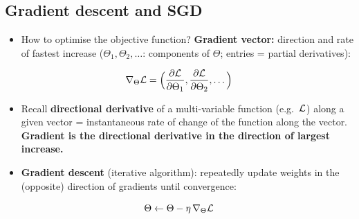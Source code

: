 \subsection{Gradient descent and SGD}\label{sec:lec03-sgd}

\begin{itemize}
  \item How to optimise the objective function? \textbf{Gradient vector:}
    direction and rate of fastest increase ($\Theta_1,\Theta_2,\dots$:
    components of $\Theta$; entries = partial derivatives):
\end{itemize}
\begin{equation}\label{eq:lec03-grad}
  \nabla_\Theta\mathcal{L} = \Bigl(\frac{\partial\mathcal{L}}{\partial\Theta_1},\frac{\partial\mathcal{L}}{\partial\Theta_2},\dots\Bigr)
\end{equation}
\begin{itemize}
  \item Recall \textbf{directional derivative} of a multi-variable function
    (e.g.\ $\mathcal{L}$) along a given vector = instantaneous rate of change of the
    function along the vector. \textbf{Gradient is the directional derivative
    in the direction of largest increase.}
  \item \textbf{Gradient descent} (iterative algorithm): repeatedly update
    weights in the (opposite) direction of gradients until convergence:
\end{itemize}
\begin{equation}\label{eq:lec03-gd}
  \Theta \leftarrow \Theta - \eta\,\nabla_\Theta\mathcal{L}
\end{equation}
